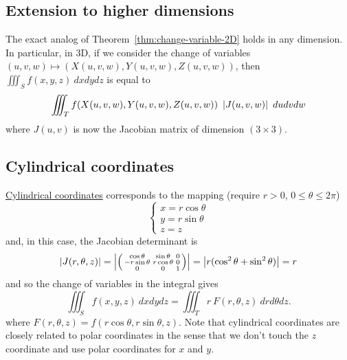 \subsection*{Extension to higher dimensions}
The exact analog of Theorem~\ref{thm:change-variable-2D} holds in any dimension.
In particular, in 3D, if we consider the change of variables \((u,v,w) \mapsto (X(u,v,w),Y(u,v,w),Z(u,v,w))\),
then \( \iiint_{S} f(x,y,z) \ dx dy dz\) is equal to
\[
    \iiint_{T} f(X(u,v,w),Y(u,v,w),Z(u,v,w)) \ \left|J(u,v,w)\right| \ du dv dw
\]
where \(J(u,v)\) is now the  Jacobian matrix of dimension \((3 \times 3)\).

\subsection*{Cylindrical coordinates}

\href{https://en.wikipedia.org/wiki/Cylindrical_coordinate_system}{Cylindrical coordinates} corresponds to the mapping (require \(r>0\), \(0\leq \theta \leq 2\pi\))
\[
    \begin{cases}
        x = r \cos \theta \\
        y = r \sin \theta \\
        z = z
    \end{cases}
\]
and, in this case, the Jacobian determinant is
\[
    \left|J(r,\theta,z)\right|
    =
    \left|\left(\begin{smallmatrix}
            \cos \theta    & \sin \theta   & 0 \\
            -r \sin \theta & r \cos \theta & 0 \\
            0              & 0             & 1
        \end{smallmatrix}\right)\right|
    =
    \left|r (\cos^2 \theta + \sin^2 \theta)\right|
    = r
\]
and so the change of variables in the integral gives
\[
    \iiint_{S} f(x,y,z) \ dx dy dz =  \iiint_{T} r \ F(r,\theta,z)   \ dr d\theta dz.
\]
where \( F(r,\theta,z) = f(r \cos \theta, r \sin \theta,  z) \).
Note that cylindrical coordinates are closely related to polar coordinates in the sense that we don't touch the \(z\) coordinate and use polar coordinates for \(x\) and \(y\).

